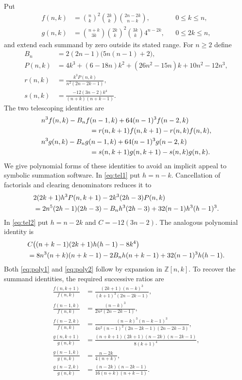 \documentclass[11pt]{article}
\theoremstyle{remark}\newtheorem{remark}[theorem]{Remark}
\newcommand{\Z}{\mathbb Z}
\numberwithin{equation}{section}
\begin{document}
Put
\begin{align*}
 f(n,k)&=\binom nk^2\binom{2k}{k}\binom{2n-2k}{n-k},
       &&0\le k\le n,\\
 g(n,k)&=\binom{n+k}{3k}\binom{2k}{k}^{\!2}
                       \binom{3k}{k}4^{n-2k},
       &&0\le2k\le n,
\end{align*}
and extend each summand by zero outside its stated range. For $n\ge2$
define
\begin{align*}
 B_n&=2(2n-1)\bigl(5n(n-1)+2\bigr),\\
 P(n,k)&=4k^3+(6-18n)k^2+(26n^2-15n)k+10n^2-12n^3,\\
 r(n,k)&=\frac{k^3P(n,k)}{n^2(2n-2k-1)},\\
 s(n,k)&=\frac{-12(3n-2)k^4}{(n+k)(n+k-1)}.
\end{align*}
The two telescoping identities are
\begin{align}
 &n^3f(n,k)-B_nf(n-1,k)+64(n-1)^3f(n-2,k)\notag\\
 &\hspace{25mm}=r(n,k+1)f(n,k+1)-r(n,k)f(n,k),\label{eq:tel1}\\
 &n^3g(n,k)-B_ng(n-1,k)+64(n-1)^3g(n-2,k)\notag\\
 &\hspace{25mm}=s(n,k+1)g(n,k+1)-s(n,k)g(n,k).\label{eq:tel2}
\end{align}
We give polynomial forms of these identities to avoid an implicit
appeal to symbolic summation software. In \eqref{eq:tel1} put $h=n-k$.
Cancellation of factorials and clearing denominators reduces it to
\begin{align}
 &2(2k+1)h^3P(n,k+1)-2k^3(2h-3)P(n,k)\notag\\
 &=2n^5(2h-1)(2h-3)-B_nh^3(2h-3)
                         +32(n-1)h^3(h-1)^3.\label{eq:poly1}
\end{align}
In \eqref{eq:tel2} put $h=n-2k$ and $C=-12(3n-2)$. The analogous
polynomial identity is
\begin{align}
 &C\bigl((n+k-1)(2k+1)h(h-1)-8k^4\bigr)\notag\\
 &=8n^3(n+k)(n+k-1)-2B_nh(n+k-1)
                         +32(n-1)^3h(h-1).\label{eq:poly2}
\end{align}
Both \eqref{eq:poly1} and \eqref{eq:poly2} follow by expansion in
$\Z[n,k]$. To recover the summand identities, the required successive
ratios are
\begin{align*}
 \frac{f(n,k+1)}{f(n,k)}
  &=\frac{(2k+1)(n-k)^3}{(k+1)^3(2n-2k-1)},\\
 \frac{f(n-1,k)}{f(n,k)}
  &=\frac{(n-k)^3}{2n^2(2n-2k-1)},\\
 \frac{f(n-2,k)}{f(n,k)}
  &=\frac{(n-k)^3(n-k-1)^3}
 {4n^2(n-1)^2(2n-2k-1)(2n-2k-3)},\\
 \frac{g(n,k+1)}{g(n,k)}
  &=\frac{(n+k+1)(2k+1)(n-2k)(n-2k-1)}{8(k+1)^4},\\
 \frac{g(n-1,k)}{g(n,k)}&=\frac{n-2k}{4(n+k)},\\
 \frac{g(n-2,k)}{g(n,k)}
  &=\frac{(n-2k)(n-2k-1)}{16(n+k)(n+k-1)}.
\end{align*}
\end{document}
